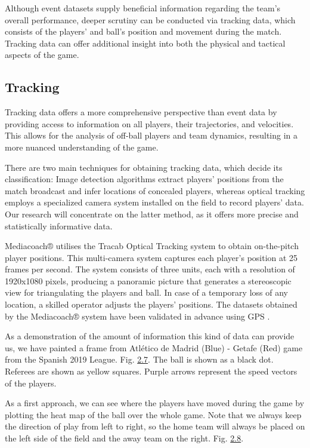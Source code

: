 \documentclass[twoside,nohyper]{tufte-book}
\begin{document}
Although event datasets supply beneficial information regarding the
team's overall performance, deeper scrutiny can be conducted via
tracking data, which consists of the players' and ball's position and
movement during the match. Tracking data can offer additional insight
into both the physical and tactical aspects of the game.

\hypertarget{tracking}{%
\subsection{Tracking}\label{tracking}}

Tracking data offers a more comprehensive perspective than event data by
providing access to information on all players, their trajectories, and
velocities. This allows for the analysis of off-ball players and team
dynamics, resulting in a more nuanced understanding of the game.

There are two main techniques for obtaining tracking data, which decide
its classification: Image detection algorithms extract players'
positions from the match broadcast and infer locations of concealed
players, whereas optical tracking employs a specialized camera system
installed on the field to record players' data. Our research will
concentrate on the latter method, as it offers more precise and
statistically informative data.

Mediacoach® utilises the Tracab Optical Tracking system to obtain
on-the-pitch player positions. This multi-camera system captures each
player's position at 25 frames per second. The system consists of three
units, each with a resolution of 1920x1080 pixels, producing a panoramic
picture that generates a stereoscopic view for triangulating the players
and ball. In case of a temporary loss of any location, a skilled
operator adjusts the players' positions. The datasets obtained by the
Mediacoach® system have been validated in advance using GPS
\citep{Felipe2019ValidationOA}.

As a demonstration of the amount of information this kind of data can
provide us, we have painted a frame from Atlético de Madrid (Blue) -
Getafe (Red) game from the Spanish 2019 League. Fig.
\protect\hyperlink{f2.7}{2.7}. The ball is shown
as a black dot. Referees are shown as yellow squares. Purple arrows
represent the speed vectors of the players.

As a first approach, we can see where the players have moved during the
game by plotting the heat map of the ball over the whole game. Note that
we always keep the direction of play from left to right, so the home
team will always be placed on the left side of the field and the away
team on the right. Fig. \protect\hyperlink{f2.8}{2.8}.
\end{document}
